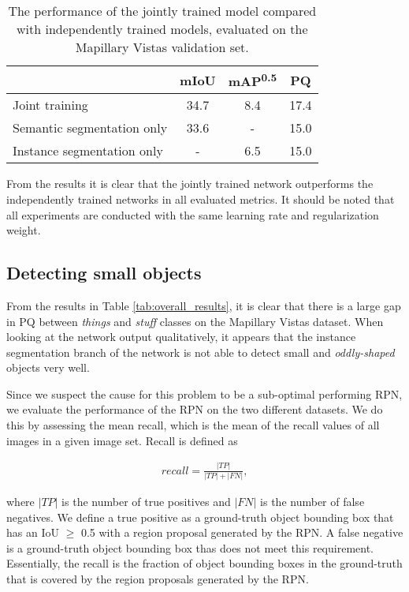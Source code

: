\documentclass[10pt,twocolumn,letterpaper]{article}
\begin{document}
\begin{table}[ht]
\centering
\begin{tabular}{ l | c | c | c }
 & mIoU & mAP\textsuperscript{0.5} & PQ \\ \hline
Joint training & 34.7 & 8.4 & 17.4 \\
Semantic segmentation only & 33.6 & - & 15.0 \\
Instance segmentation only & - & 6.5 & 15.0 \\
\end{tabular}
\caption{The performance of the jointly trained model compared with independently trained models, evaluated on the Mapillary Vistas validation set.}
\label{tab:joint_training}
\end{table}

From the results it is clear that the jointly trained network outperforms the independently trained networks in all evaluated metrics. It should be noted that all experiments are conducted with the same learning rate and regularization weight. 

\subsection{Detecting small objects}
From the results in Table \ref{tab:overall_results}, it is clear that there is a large gap in PQ between \textit{things} and \textit{stuff} classes on the Mapillary Vistas dataset. When looking at the network output qualitatively, it appears that the instance segmentation branch of the network is not able to detect small and \textit{oddly-shaped} objects very well.

Since we suspect the cause for this problem to be a sub-optimal performing RPN, we evaluate the performance of the RPN on the two different datasets. We do this by assessing the mean recall, which is the mean of the recall values of all images in a given image set. Recall is defined as

\begin{equation*}
\begin{aligned}
recall = \frac{|TP|}{|TP|+|FN|},
\end{aligned}
\end{equation*}

where $|TP|$ is the number of true positives and $|FN|$ is the number of false negatives. We define a true positive as a ground-truth object bounding box that has an IoU $\geq$ 0.5 with a region proposal generated by the RPN. A false negative is a ground-truth object bounding box thas does not meet this requirement. Essentially, the recall is the fraction of object bounding boxes in the ground-truth that is covered by the region proposals generated by the RPN. 
\end{document}
